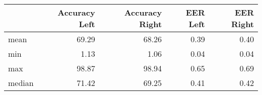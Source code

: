 \begin{tabular}{lrrrr}
\toprule
{} &  Accuracy Left &  Accuracy Right &  EER Left &  EER Right \\
\midrule
mean   &          69.29 &           68.26 &      0.39 &       0.40 \\
min    &           1.13 &            1.06 &      0.04 &       0.04 \\
max    &          98.87 &           98.94 &      0.65 &       0.69 \\
median &          71.42 &           69.25 &      0.41 &       0.42 \\
\bottomrule
\end{tabular}
